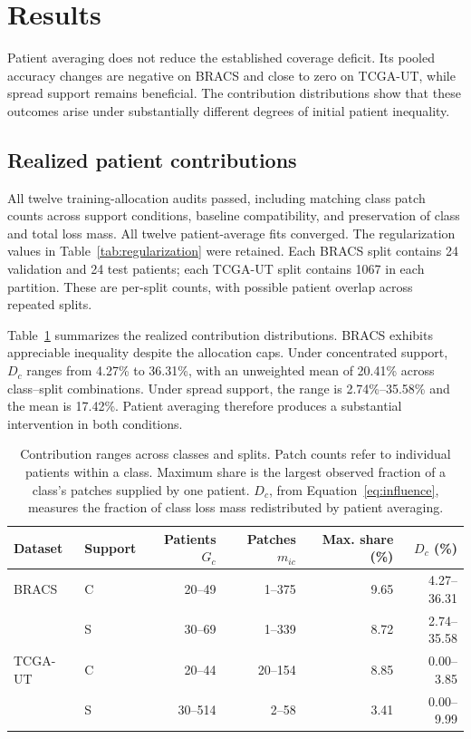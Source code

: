 \section{Results}
\label{sec:results}
Patient averaging does not reduce the established coverage deficit. Its pooled accuracy changes are negative on BRACS and close to zero on TCGA-UT, while spread support remains beneficial. The contribution distributions show that these outcomes arise under substantially different degrees of initial patient inequality.

\subsection{Realized patient contributions}
All twelve training-allocation audits passed, including matching class patch counts across support conditions, baseline compatibility, and preservation of class and total loss mass. All twelve patient-average fits converged. The regularization values in Table~\ref{tab:regularization} were retained. Each BRACS split contains 24 validation and 24 test patients; each TCGA-UT split contains \num{1067} in each partition. These are per-split counts, with possible patient overlap across repeated splits.

Table~\ref{tab:contribution-results} summarizes the realized contribution distributions. BRACS exhibits appreciable inequality despite the allocation caps. Under concentrated support, \(D_c\) ranges from 4.27\% to 36.31\%, with an unweighted mean of 20.41\% across class--split combinations. Under spread support, the range is 2.74\%--35.58\% and the mean is 17.42\%. Patient averaging therefore produces a substantial intervention in both conditions.

\begin{table}[htbp]
\centering\small
\setlength{\tabcolsep}{4pt}
\begin{tabular}{@{}llrrrr@{}}
\toprule
Dataset & Support & Patients \(G_c\) & Patches \(m_{ic}\) & Max. share (\%) & \(D_c\) (\%) \\
\midrule
BRACS & C & 20--49 & 1--375 & 9.65 & 4.27--36.31 \\
& S & 30--69 & 1--339 & 8.72 & 2.74--35.58 \\
TCGA-UT & C & 20--44 & 20--154 & 8.85 & 0.00--3.85 \\
& S & 30--514 & 2--58 & 3.41 & 0.00--9.99 \\
\bottomrule
\end{tabular}
\caption{Contribution ranges across classes and splits. Patch counts refer to individual patients within a class. Maximum share is the largest observed fraction of a class's patches supplied by one patient. \(D_c\), from Equation~\eqref{eq:influence}, measures the fraction of class loss mass redistributed by patient averaging.}
\label{tab:contribution-results}
\end{table}

